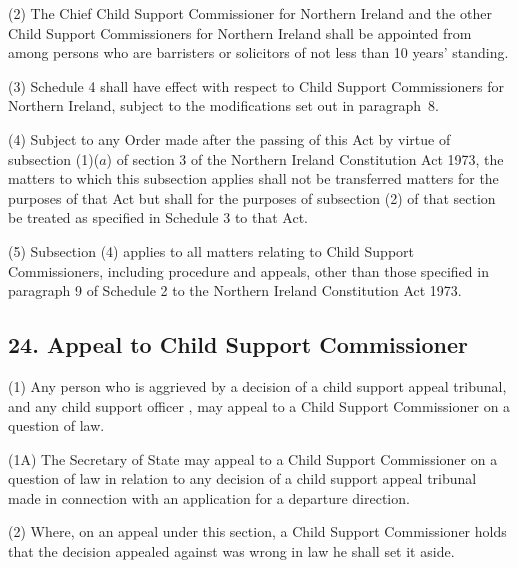 \documentclass[12pt,a4paper]{article}
\begin{document}
(2) The Chief Child Support Commissioner for Northern Ireland and the other Child Support Commissioners for Northern Ireland shall be appointed from among persons who are barristers or solicitors of not less than 10 years' standing.

(3) Schedule 4 shall have effect with respect to Child Support Commissioners for Northern Ireland, subject to the modifications set out in paragraph~8.

(4) Subject to any Order made after the passing of this Act by virtue of subsection (1)($a$)  of section 3 of the Northern Ireland Constitution Act 1973, the matters to which this subsection applies shall not be transferred matters for the purposes of that Act but shall for the purposes of subsection (2)  of that section be treated as specified in Schedule 3 to that Act.

(5) Subsection (4)  applies to all matters relating to Child Support Commissioners, including procedure and appeals, other than those specified in paragraph 9 of Schedule 2 to the Northern Ireland Constitution Act 1973.


\subsection{24. Appeal to Child Support Commissioner}

(1) Any person who is aggrieved by a decision of 
a child support appeal tribunal, and any child support officer%
, may appeal to a Child Support Commissioner on a question of law.

(1A) The Secretary of State may appeal to a Child Support Commissioner on a question of law in relation to any decision of a child support appeal tribunal made in connection with an application for a departure direction.

(2) Where, on an appeal under this section, a Child Support Commissioner holds that the decision appealed against was wrong in law he shall set it aside.
\end{document}
